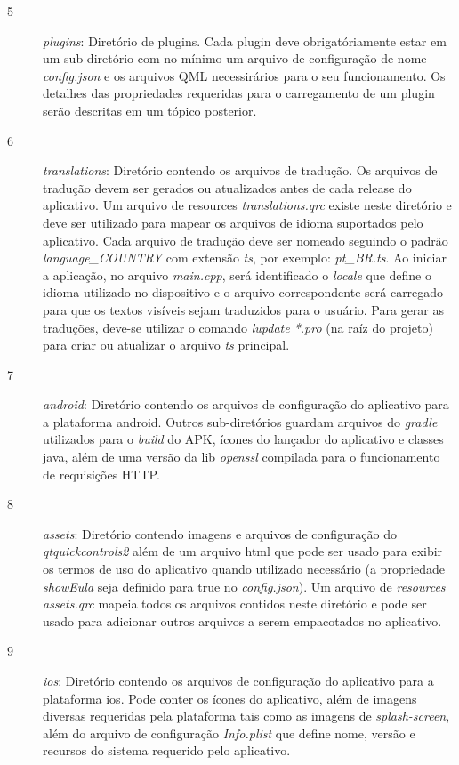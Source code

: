 \begin{description}
	\item[5] \textit{plugins}: Diretório de plugins. Cada plugin deve obrigatóriamente estar em um sub-diretório com no mínimo um arquivo de configuração de nome \textit{config.json} e os arquivos QML necessirários para o seu funcionamento. Os detalhes das propriedades requeridas para o carregamento de um plugin serão descritas em um tópico posterior.

	\item[6] \textit{translations}: Diretório contendo os arquivos de tradução. Os arquivos de tradução devem ser gerados ou atualizados antes de cada release do aplicativo. Um arquivo de resources \textit{translations.qrc} existe neste diretório e deve ser utilizado para mapear os arquivos de idioma suportados pelo aplicativo. Cada arquivo de tradução deve ser nomeado seguindo o padrão \textit{language\_COUNTRY} com extensão \textit{ts}, por exemplo: \textit{pt\_BR.ts}. Ao iniciar a aplicação, no arquivo \textit{main.cpp}, será identificado o \textit{locale} que define o idioma utilizado no dispositivo e o arquivo correspondente será carregado para que os textos visíveis sejam traduzidos para o usuário. Para gerar as traduções, deve-se utilizar o comando \textit{lupdate *.pro} (na raíz do projeto) para criar ou atualizar o arquivo \textit{ts} principal.

	\item[7] \textit{android}: Diretório contendo os arquivos de configuração do aplicativo para a plataforma android. Outros sub-diretórios guardam arquivos do \textit{gradle} utilizados para o \textit{build} do APK, ícones do lançador do aplicativo e classes java, além de uma versão da lib \textit{openssl} compilada para o funcionamento de requisições HTTP.

	\item[8] \textit{assets}: Diretório contendo imagens e arquivos de configuração do \textit{qtquickcontrols2} além de um arquivo html que pode ser usado para exibir os termos de uso do aplicativo quando utilizado necessário (a propriedade \textit{showEula} seja definido para true no \textit{config.json}). Um arquivo de \textit{resources} \textit{assets.qrc} mapeia todos os arquivos contidos neste diretório e pode ser usado para adicionar outros arquivos a serem empacotados no aplicativo.

	\item[9] \textit{ios}: Diretório contendo os arquivos de configuração do aplicativo para a plataforma ios. Pode conter os ícones do aplicativo, além de imagens diversas requeridas pela plataforma tais como as imagens de \textit{splash-screen}, além do arquivo de configuração \textit{Info.plist} que define nome, versão e recursos do sistema requerido pelo aplicativo.
\end{description}


